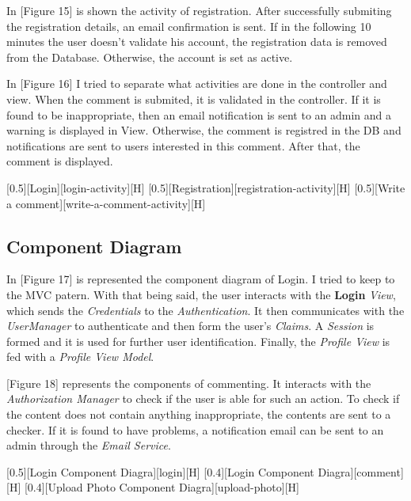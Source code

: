 \documentclass{article}
\begin{document}
			\bigskip
			In [Figure 15] is shown the activity of registration. After successfully submiting the registration details, an email confirmation is sent. If in the following 10 minutes the user doesn't validate his account, the registration data is removed from the Database. Otherwise, the account is set as active.

			\bigskip
			In [Figure 16] I tried to separate what activities are done in the controller and view. When the comment is submited, it is validated in the controller. If it is found to be inappropriate, then an email notification is sent to an admin and a warning is displayed in View. Otherwise, the comment is registred in the DB and notifications are sent to users interested in this comment. After that, the comment is displayed.

			[0.5][Login][login-activity][H]
			[0.5][Registration][registration-activity][H]
			[0.5][Write a comment][write-a-comment-activity][H]

		\subsection{Component Diagram}
			In [Figure 17] is represented the component diagram of Login. I tried to keep to the MVC patern. With that being said, the user interacts with the \textbf{Login} \textit{View}, which sends the \textit{Credentials} to the \textit{Authentication}. It then communicates with the \textit{UserManager} to authenticate and then form the user's \textit{Claims}. A \textit{Session} is formed and it is used for further user identification. Finally, the \textit{Profile View} is fed with a \textit{Profile View Model}.

			[Figure 18] represents the components of commenting. It interacts with the \textit{Authorization Manager} to check if the user is able for such an action. To check if the content does not contain anything inappropriate, the contents are sent to a checker. If it is found to have problems, a notification email can be sent to an admin through the \textit{Email Service}.

			[0.5][Login Component Diagra][login][H]
			[0.4][Login Component Diagra][comment][H]
			[0.4][Upload Photo Component Diagra][upload-photo][H]
\end{document}
